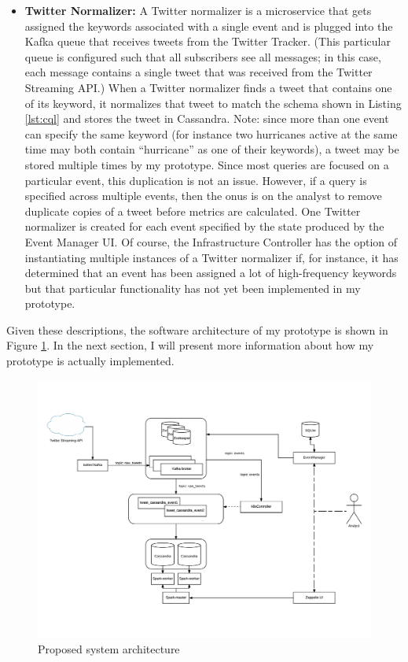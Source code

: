 \begin{itemize}
	\item \textbf{Twitter Normalizer:} A Twitter normalizer is a microservice that gets assigned the keywords associated with a single event and is plugged into the Kafka queue that receives tweets from the Twitter Tracker. (This particular queue is configured such that all subscribers see all messages; in this case, each message contains a single tweet that was received from the Twitter Streaming API.) When a Twitter normalizer finds a tweet that contains one of its keyword, it normalizes that tweet to match the schema shown in Listing \ref{lst:cql} and stores the tweet in Cassandra. Note: since more than one event can specify the same keyword (for instance two hurricanes active at the same time may both contain “hurricane” as one of their keywords), a tweet may be stored multiple times by my prototype. Since most queries are focused on a particular event, this duplication is not an issue. However, if a query is specified across multiple events, then the onus is on the analyst to remove duplicate copies of a tweet before metrics are calculated. One Twitter normalizer is created for each event specified by the state produced by the Event Manager UI. Of course, the Infrastructure Controller has the option of instantiating multiple instances of a Twitter normalizer if, for instance, it has determined that an event has been assigned a lot of high-frequency keywords but that particular functionality has not yet been implemented in my prototype.
\end{itemize}

Given these descriptions, the software architecture of my prototype is shown in Figure \ref{fig:SysArch}. In the next section, I will present more information about how my prototype is actually implemented.

\begin{figure}
\centering
\includegraphics[width=\textwidth]{Figures/SysArch}
\decoRule
\caption[System architecture]{Proposed system architecture}
\label{fig:SysArch}
\end{figure}